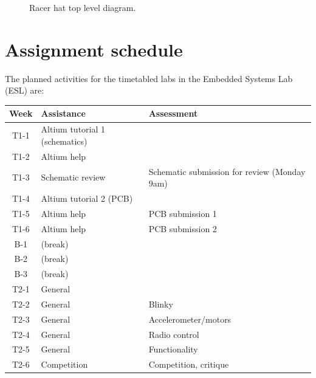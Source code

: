 \documentclass[11pt, a4paper]{article}
\begin{document}

\begin{figure}[h]
  \centering
  
  \caption{Racer hat top level diagram.}
\end{figure}


\vfill\pagebreak

\section{Assignment schedule}

The planned activities for the timetabled labs in the Embedded Systems
Lab (ESL) are:
%
\begin{flushleft}
  \begin{tabular}{ c l l }
    Week            &  Assistance  &  Assessment \\
    \hline \hline
    T1-1 & Altium tutorial 1 (schematics)  & \\
    T1-2 & Altium help      & \\
    T1-3 & Schematic review & Schematic submission for review (Monday 9am) \\
    T1-4 & Altium tutorial 2 (PCB) &          \\
    T1-5 & Altium help      & PCB submission 1    \\
    T1-6 & Altium help      & PCB submission 2    \\
    \hline
    B-1  & (break)          &                   \\
    B-2  & (break)          &                   \\
    B-3  & (break)          &                   \\
    \hline
    T2-1 & General          &                   \\
    T2-2 & General          & Blinky            \\
    T2-3 & General          & Accelerometer/motors        \\
    T2-4 & General          & Radio control     \\
    T2-5 & General          & Functionality     \\
    T2-6 & Competition      & Competition, critique  \\
  \end{tabular}
\end{flushleft}
\end{document}
